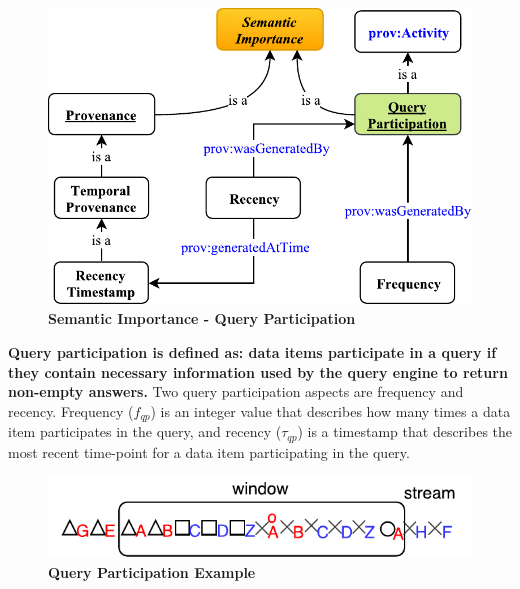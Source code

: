 \begin{figure}[!htbp]
	\centering
    \includegraphics[width=5in]{img/3-siqp.pdf}
    \caption{\textbf{Semantic Importance - Query Participation}}
    \label{fig:3-siqp}
\end{figure}

\textbf{Query participation is defined as: data items participate in a query if they contain necessary information used by the query engine to return non-empty answers.}
Two query participation aspects are frequency and recency.
Frequency ($f_{qp}$) is an integer value that describes how many times a data item participates in the query, 
and recency ($\tau_{qp}$) is a timestamp that describes the most recent time-point for a data item participating in the query.

\begin{figure}[!htbp]
	\centering
    \includegraphics[width=5in]{img/3-siqpe.pdf}
    \caption{\textbf{Query Participation Example}}
    \label{fig:3-siqpe}
\end{figure}

